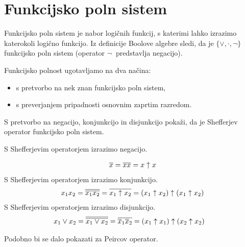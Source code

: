 \section{Funkcijsko poln sistem}

Funkcijsko poln sistem je nabor logičnih funkcij, s katerimi lahko izrazimo katerokoli logično funkcijo. Iz definicije Boolove algebre sledi, da je $\{\vee,\cdot,\neg\}$ funkcijsko poln sistem (operator $\neg\ $ predstavlja negacijo).

Funkcijsko polnost ugotavljamo na dva načina:
\begin{itemize}
\item s pretvorbo na nek znan funkcijsko poln sistem,
\item s preverjanjem pripadnosti osnovnim zaprtim razredom.
\end{itemize}

\begin{zgled}
S pretvorbo na negacijo, konjunkcijo in disjunkcijo pokaži, da je Shefferjev operator funkcijsko poln sistem.
\end{zgled}
\begin{resitev}

S Shefferjevim operatorjem izrazimo negacijo.

\begin{align*}
\overline x & = \overline x \overline x  = x \uparrow x\\
\end{align*}
S Shefferjevim operatorjem izrazimo konjunkcijo.
\begin{align*}
x_1 x_2 & = \overline{\overline{x_1 x_2}} = \overline{x_1 \uparrow x_2} = (x_1 \uparrow x_2) \uparrow (x_1 \uparrow x_2) \\
\end{align*}
S Shefferjevim operatorjem izrazimo disjunkcijo.
\begin{align*}
x_1 \vee x_2 & = \overline{\overline{x_1 \vee x_2}} = \overline{\overline x_1 \overline x_2} = (x_1 \uparrow x_1) \uparrow (x_2 \uparrow x_2)
\end{align*}
\end{resitev}
Podobno bi se dalo pokazati za Peircov operator.


